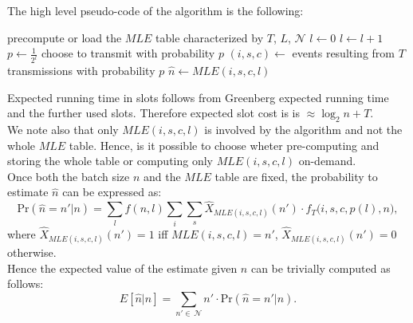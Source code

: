 \documentclass[11pt,a4paper,twoside,openright]{book}
\newcommand{\algname}[1]{\ensuremath{\mbox{\sc #1}}}
\begin{document}
The high level pseudo-code of the algorithm is the following: 
\begin{algorithm}[H]
\begin{algorithmic}
\STATE precompute or load the $MLE$ table characterized by $T$, $L$, $\mathcal{N}$
\STATE $l\gets 0$
\REPEAT
	\STATE $l\gets l+1$
	\STATE $p \gets {\displaystyle\frac{1}{2^{l}}}$
	\STATE choose to transmit with probability $p$
\STATE $(i,s,c) \gets$ events resulting from $T$ transmissions with probability $p$
\STATE $\hat{n}\gets MLE(i,s,c,l)$
\end{algorithmic}
\caption{\algname{EGA $(\mathcal{B},T,\mathcal{N})$}}
\label{alg-greenberg+MLE}
\end{algorithm}
Expected running time in slots follows from Greenberg expected running time and the further used slots. Therefore expected slot cost is is $\approx \log_{2}n+T$.\\ 
We note also that only $MLE(i,s,c,l)$ is involved by the algorithm and not the whole $MLE$ table. Hence, is it possible to choose wheter pre-computing and storing the whole table or computing only $MLE(i,s,c,l)$ on-demand.\\
Once both the batch size $n$ and the $MLE$ table are fixed, the probability to estimate $\hat{n}$ can be expressed as:
\begin{equation}
\textrm{Pr}(\hat{n}=n'|n)=\sum_{l}f(n,l)\sum_{i}\sum_{s} \hat{X}_{MLE(i,s,c,l)}(n') \cdot f_{T}\big(i,s,c,p(l),n\bigl),
\end{equation}
 where  $\hat{X}_{MLE(i,s,c,l)}(n')=1$ iff $MLE(i,s,c,l)=n'$,  $\hat{X}_{MLE(i,s,c,l)}(n')=0$ otherwise. \\
Hence the expected value of the estimate given $n$ can be trivially computed as follows:
\begin{equation}
E[\hat{n}|n]=\sum_{n'\in\,\mathcal{N}}n'\cdot\textrm{Pr}(\hat{n}=n'|n).
\label{eq:EGA expected estimate given n}
\end{equation}
 

\end{document}

